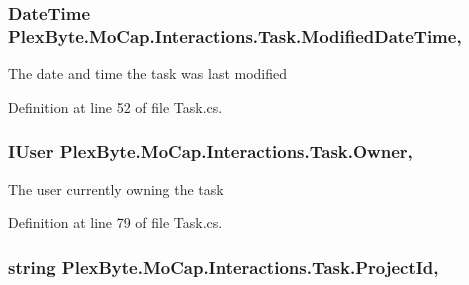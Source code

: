 \subsubsection[{\texorpdfstring{Modified\+Date\+Time}{ModifiedDateTime}}]{\setlength{\rightskip}{0pt plus 5cm}Date\+Time Plex\+Byte.\+Mo\+Cap.\+Interactions.\+Task.\+Modified\+Date\+Time\hspace{0.3cm}{\ttfamily [get]}, {\ttfamily [set]}}\hypertarget{class_plex_byte_1_1_mo_cap_1_1_interactions_1_1_task_aea629926c184e80ae57914422f5fcb4c}{}\label{class_plex_byte_1_1_mo_cap_1_1_interactions_1_1_task_aea629926c184e80ae57914422f5fcb4c}


The date and time the task was last modified 



Definition at line 52 of file Task.\+cs.

\subsubsection[{\texorpdfstring{Owner}{Owner}}]{\setlength{\rightskip}{0pt plus 5cm}I\+User Plex\+Byte.\+Mo\+Cap.\+Interactions.\+Task.\+Owner\hspace{0.3cm}{\ttfamily [get]}, {\ttfamily [set]}}\hypertarget{class_plex_byte_1_1_mo_cap_1_1_interactions_1_1_task_a3cdc15c2ceb9683e5b19d76462a5fb21}{}\label{class_plex_byte_1_1_mo_cap_1_1_interactions_1_1_task_a3cdc15c2ceb9683e5b19d76462a5fb21}


The user currently owning the task 



Definition at line 79 of file Task.\+cs.

\subsubsection[{\texorpdfstring{Project\+Id}{ProjectId}}]{\setlength{\rightskip}{0pt plus 5cm}string Plex\+Byte.\+Mo\+Cap.\+Interactions.\+Task.\+Project\+Id\hspace{0.3cm}{\ttfamily [get]}, {\ttfamily [set]}}\hypertarget{class_plex_byte_1_1_mo_cap_1_1_interactions_1_1_task_a5827bb9ca244149e76780756ce196057}{}\label{class_plex_byte_1_1_mo_cap_1_1_interactions_1_1_task_a5827bb9ca244149e76780756ce196057}


